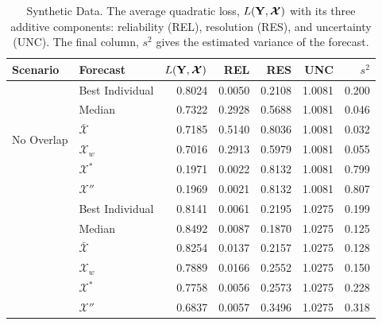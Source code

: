 \documentclass[11pt]{article}
\theoremstyle{definition}
\theoremstyle{definition}
\def\Y{{\bf Y}}
\begin{document}
\begin{table}[h!]
\centering
\caption{Synthetic Data. The average quadratic loss, $L(\Y,\boldsymbol{\mathcal{X}} )$ with its three additive components: reliability (REL), resolution (RES), and uncertainty (UNC). The final column, $s^2$ gives the estimated variance of the forecast.} 
\begin{tabular}{llrrrrr}
  \hline \hline
Scenario & Forecast & $L(\Y,\boldsymbol{\mathcal{X}} )$ & REL & RES & UNC & $s^2$ \\ 
  \hline
 \multirow{6}{*}{No Overlap} & Best Individual & 0.8024 & 0.0050 & 0.2108 & 1.0081 & 0.200\\ 
  & Median & 0.7322 & 0.2928 & 0.5688 & 1.0081& 0.046\\ 
  & $\bar{\mathcal{X}}$ & 0.7185 & 0.5140 & 0.8036 & 1.0081 & 0.032\\ 
  & $\mathcal{X}_w$ & 0.7016 & 0.2913 & 0.5979 & 1.0081 & 0.055\\ 
  & $\mathcal{X}^*$  & 0.1971 & 0.0022 & 0.8132 & 1.0081& 0.799\\ 
  & $\mathcal{X}''$ & 0.1969 & 0.0021 & 0.8132 & 1.0081 & 0.807\\ \rule{0pt}{2.9ex} 
  \multirow{6}{*}{High Overlap} &  Best Individual & 0.8141 & 0.0061 & 0.2195 & 1.0275 &0.199\\ 
  & Median & 0.8492 & 0.0087 & 0.1870 & 1.0275 &0.125 \\ 
  & $\bar{\mathcal{X}}$ & 0.8254 & 0.0137 & 0.2157 & 1.0275 &0.128\\ 
  & $\mathcal{X}_w$ & 0.7889 & 0.0166 & 0.2552 & 1.0275 &0.150 \\ 
  & $\mathcal{X}^*$  & 0.7758 & 0.0056 & 0.2573 & 1.0275 &0.228 \\ 
  &$\mathcal{X}''$ & 0.6837 & 0.0057 & 0.3496 & 1.0275 &0.318 \\ 
   \hline
\end{tabular}
\label{scenA}
\end{table}
\end{document}
